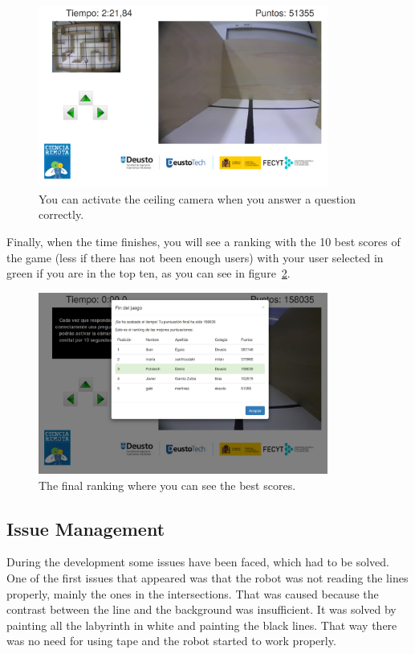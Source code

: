 \begin{figure}[!htbp]
	\centering
	\includegraphics[width=0.85\textwidth]{fig/manuals/trivial/romie-ceiling}
	\caption{You can activate the ceiling camera when you answer a question correctly.}
	\label{fig:man:romie_ceiling}
\end{figure}

Finally, when the time finishes, you will see a ranking with the 10 best scores of the game (less if
there has not been enough users) with your user selected in green if you are in the top ten, as you
can see in figure~\ref{fig:man:romie_ranking}.

\begin{figure}[!htbp]
	\centering
	\includegraphics[width=0.85\textwidth]{fig/manuals/trivial/romie-ranking}
	\caption{The final ranking where you can see the best scores.}
	\label{fig:man:romie_ranking}
\end{figure}

\subsection{Issue Management}

During the development some issues have been faced, which had to be solved. One of the first issues
that appeared was that the robot was not reading the lines properly, mainly the ones in the
intersections. That was caused because the contrast between the line and the background was
insufficient. It was solved by painting all the labyrinth in white and painting the black lines.
That way there was no need for using tape and the robot started to work properly.

